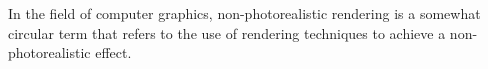 In the field of computer graphics, non-photorealistic rendering is a somewhat circular term that refers to the use of rendering techniques to achieve a non-photorealistic effect.
